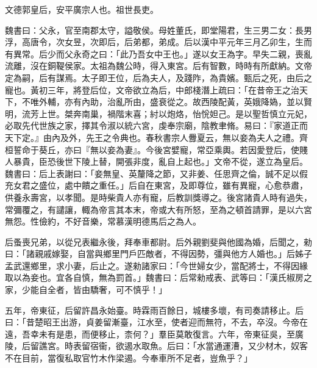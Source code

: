 
\begin{pinyinscope}
文德郭皇后，安平廣宗人也。祖世長吏。

魏書曰：父永，官至南郡太守，謚敬侯。母姓董氏，即堂陽君，生三男二女：長男浮，高唐令，次女昱，次即后，后弟都，弟成。后以漢中平元年三月乙卯生，生而有異常。后少而父永奇之曰：「此乃吾女中王也。」遂以女王為字。早失二親，喪亂流離，沒在銅鞮侯家。太祖為魏公時，得入東宮。后有智數，時時有所獻納。文帝定為嗣，后有謀焉。太子即王位，后為夫人，及踐阼，為貴嬪。甄后之死，由后之寵也。黃初三年，將登后位，文帝欲立為后，中郎棧潛上疏曰：「在昔帝王之治天下，不唯外輔，亦有內助，治亂所由，盛衰從之。故西陵配黃，英娥降媯，並以賢明，流芳上世。桀奔南巢，禍階末喜；紂以炮烙，怡恱妲己。是以聖哲慎立元妃，必取先代世族之家，擇其令淑以統六宮，虔奉宗廟，陰教聿脩。易曰：『家道正而天下定。』由內及外，先王之令典也。春秋書宗人釁夏云，無以妾為夫人之禮。齊桓誓命于葵丘，亦曰『無以妾為妻』。今後宮嬖寵，常亞乘輿。若因愛登后，使賤人暴貴，臣恐後世下陵上替，開張非度，亂自上起也。」文帝不從，遂立為皇后。魏書曰：后上表謝曰：「妾無皇、英釐降之節，又非姜、任思齊之倫，誠不足以假充女君之盛位，處中饋之重任。」后自在東宮，及即尊位，雖有異寵，心愈恭肅，供養永壽宮，以孝聞。是時柴貴人亦有寵，后教訓獎導之。後宮諸貴人時有過失，常彌覆之，有譴讓，輙為帝言其本末，帝或大有所怒，至為之頓首請罪，是以六宮無怨。性儉約，不好音樂，常慕漢明德馬后之為人。

后蚤喪兄弟，以從兄表繼永後，拜奉車都尉。后外親劉斐與他國為婚，后聞之，勑曰：「諸親戚嫁娶，自當與鄉里門戶匹敵者，不得因勢，彊與他方人婚也。」后姊子孟武還鄉里，求小妻，后止之。遂勑諸家曰：「今世婦女少，當配將士，不得因緣取以為妾也。宜各自慎，無為罰首。」魏書曰：后常勑戒表、武等曰：「漢氏椒房之家，少能自全者，皆由驕奢，可不慎乎！」

五年，帝東征，后留許昌永始臺。時霖雨百餘日，城樓多壞，有司奏請移止。后曰：「昔楚昭王出游，貞姜留漸臺，江水至，使者迎而無符，不去，卒沒。今帝在遠，吾幸未有是患，而便移止，柰何？」羣臣莫敢復言。六年，帝東征吳，至廣陵，后留譙宮。時表留宿衞，欲遏水取魚。后曰：「水當通運漕，又少材木，奴客不在目前，當復私取官竹木作梁遏。今奉車所不足者，豈魚乎？」


\end{pinyinscope}
